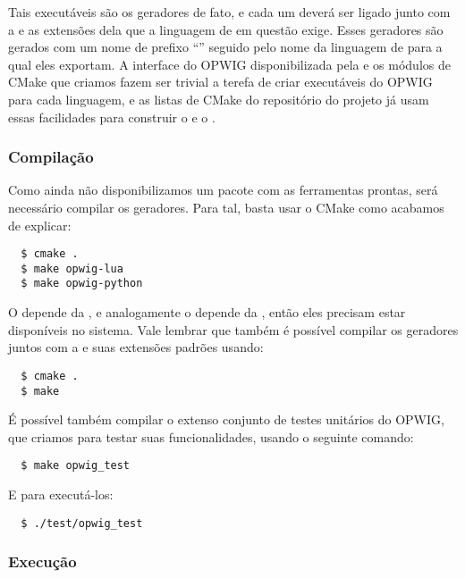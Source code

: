 Tais executáveis são os geradores de fato, e cada um deverá ser ligado junto com a
 e as extensões dela que a linguagem de \script{} em questão exige. 
Esses geradores são gerados com um nome de prefixo ``'' seguido pelo nome da
linguagem de \script{} para a qual eles exportam. A interface do
OPWIG disponibilizada pela  e os módulos de CMake que criamos fazem
ser trivial a terefa de criar executáveis do OPWIG para cada linguagem, e as listas de CMake
do repositório do projeto já usam essas facilidades para construir o 
e o .

\subsubsection{Compilação}
Como ainda não disponibilizamos um pacote com as ferramentas prontas, será necessário
compilar os geradores. Para tal, basta usar o CMake como acabamos de explicar:

\begin{verbatim}
  $ cmake .
  $ make opwig-lua
  $ make opwig-python
\end{verbatim}


O  depende da , e analogamente o 
depende da , então eles precisam estar disponíveis no sistema.
Vale lembrar que também é possível compilar os geradores juntos com a
 e suas extensões padrões usando:

\begin{verbatim}
  $ cmake .
  $ make
\end{verbatim}

É possível também compilar o extenso conjunto de testes unitários do OPWIG, que
criamos para testar suas funcionalidades, usando o seguinte comando:

\begin{verbatim}
  $ make opwig_test
\end{verbatim}

E para executá-los:

\begin{verbatim}
  $ ./test/opwig_test
\end{verbatim}

\subsubsection{Execução}

